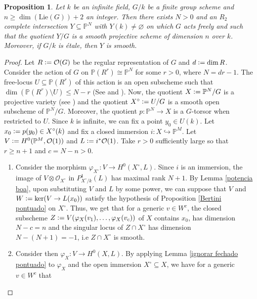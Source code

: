 \documentclass[a4paper,12pt]{amsart}
\newtheorem{proposition}[definition]{Proposition}
\numberwithin{equation}{section}
\newcommand{\defeq}{\vcentcolon=}
\renewcommand{\leq}{\leqslant}
\renewcommand{\geq}{\geqslant}
\renewcommand{\_}{\rule{0.25cm}{0.4pt}}
\begin{document}
\begin{proposition}\label{Godeaux--Serre normal}
    Let $k$ be an infinite field, $G/k$ be a finite group scheme and $n\geq \dim(\text{Lie}(G))+2$ an integer. Then there exists $N>0$ and an $R_{2}$ complete intersection $Y\subseteq \mathbb{P}^{N}$ with $Y(k)\neq \varnothing$ on which $G$ acts freely and such that the quotient $Y/G$ is a smooth projective scheme of dimension $n$ over $k$. Moreover, if $G/k$ is étale, then $Y$ is smooth.
\end{proposition}
\begin{proof}
    Let $R\defeq \mathcal{O}(G)$ be the regular representation of $G$ and $d\defeq \dim R$. Consider the action of $G$ on $\mathbb{P}(R^{r})\cong \mathbb{P}^{N}$ for some $r>0$, where $N=dr-1$. The free-locus $U\subseteq \mathbb{P}(R^{r})$ of this action is an open subscheme such that $\dim(\mathbb{P}(R^{r})\setminus U)\leq N-r$ (See \cite[Lemma 4.2.2]{AST_1979__64__87_0} and \cite[Lemma 3.6.]{kothari2024arbitrarilylargejumpsrham}). Now, the quotient $X\defeq \mathbb{P}^{N}/G$ is a projective variety (see \cite[Exposé V, Théorème 4.1.]{SGA3}) and the quotient $X^{\circ}\defeq U/G$ is a smooth open subscheme of $\mathbb{P}^{N}/G$. Moreover, the quotient $p\colon \mathbb{P}^{N}\to X$ is a $G$-torsor when restricted to $U$. Since $k$ is infinite, we can fix a point $y_{0}\in U(k)$. Let $x_{0}\defeq p(y_{0})\in X^{\circ}(k)$ and fix a closed immersion $i\colon X\hookrightarrow \mathbb{P}^{M}$. Let $V\defeq H^{0}(\mathbb{P}^{M},\mathcal{O}(1))$ and $L\defeq i^{\ast}\mathcal{O}(1)$. Take $r>0$ sufficiently large so that $r\geq n+1$ and $c=N-n>0$.
    \begin{enumerate}
        \item Consider the morphism $\varphi_{X^{\circ}}\colon V\to H^{0}(X^{\circ},L)$. Since $i$ is an immersion, the image of $V\otimes \mathcal{O}_{X^{\circ}}$ in $P^{1}_{X^{\circ}/k}(L)$ has maximal rank $N+1$. By Lemma \ref{potencia boa}, upon substituting $V$ and $L$ by some power, we can suppose that $V$ and $W\defeq \ker(V\to L(x_{0}))$ satisfy the hypothesis of Proposition \ref{Bertini pontuado} on $X^{\circ}$. Thus, we get that for a generic $v\in W^{c}$, the closed subscheme $Z\defeq V(\varphi_{X}(v_{1}),\dots,\varphi_{X}(v_{c}))$ of $X$ contains $x_{0}$, has dimension $N-c=n$ and the singular locus of $Z\cap X^{\circ}$ has dimension $N-(N+1)=-1$, i.e $Z\cap X^{\circ}$ is smooth. 
        \item Consider then $\varphi_{X}\colon V\to H^{0}(X,L)$. By applying Lemma \ref{ignorar fechado pontuado} to $\varphi_{X}$ and the open immersion $X^{\circ}\subseteq X$, we have for a generic $v\in W^{c}$ that

\end{enumerate}
\end{proof}
\end{document}
